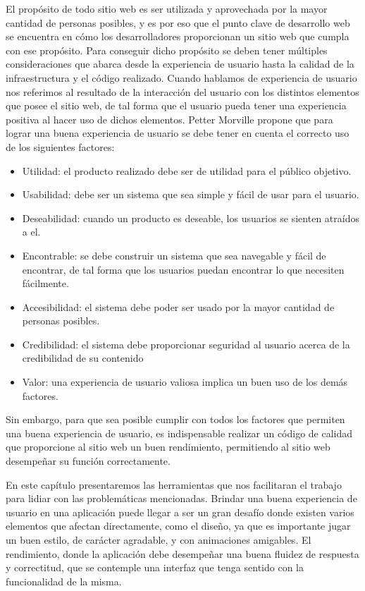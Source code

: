 El propósito de todo sitio web es ser utilizada y aprovechada por la mayor cantidad de personas posibles, y es por eso que el punto clave de desarrollo web se encuentra en cómo los desarrolladores proporcionan un sitio web que cumpla con ese propósito. Para conseguir dicho propósito se deben tener múltiples consideraciones que abarca desde la experiencia de usuario hasta la calidad de la infraestructura y el código realizado. Cuando hablamos de experiencia de usuario nos referimos al resultado de la interacción del usuario con los distintos elementos que posee el sitio web, de tal forma que el usuario pueda tener una experiencia positiva al hacer uso de dichos elementos. Petter Morville \cite{UXFactors} propone que para lograr una buena experiencia de usuario se debe tener en cuenta el correcto uso de los siguientes factores:

\begin{itemize}
    \item Utilidad: el producto realizado debe ser de utilidad para el público objetivo.
    \item Usabilidad: debe ser un sistema que sea simple y fácil de usar para el usuario.
    \item Deseabilidad: cuando un producto es deseable, los usuarios se sienten atraídos a el.
    \item Encontrable: se debe construir un sistema que sea navegable y fácil de encontrar, de tal forma que los usuarios puedan encontrar lo que necesiten fácilmente.
    \item Accesibilidad: el sistema debe poder ser usado por la mayor cantidad de personas posibles.
    \item Credibilidad: el sistema debe proporcionar seguridad al usuario acerca de la credibilidad de su contenido
    \item Valor: una experiencia de usuario valiosa implica un buen uso de los demás factores.
\end{itemize}

Sin embargo, para que sea posible cumplir con todos los factores que permiten una buena experiencia de usuario,
es indispensable realizar un código de calidad que proporcione al sitio web un buen rendimiento, permitiendo al sitio web
desempeñar su función correctamente.

En este capítulo presentaremos las herramientas que nos facilitaran el trabajo para lidiar con las problemáticas mencionadas.
Brindar una buena experiencia de usuario en una aplicación puede llegar a ser un gran desafío donde existen varios elementos que afectan directamente, como el diseño, ya que es importante jugar un buen estilo, de carácter agradable, y con animaciones amigables. El rendimiento, donde la aplicación debe desempeñar una buena fluidez de respuesta y correctitud, que se contemple una interfaz que tenga sentido con la funcionalidad de la misma.

